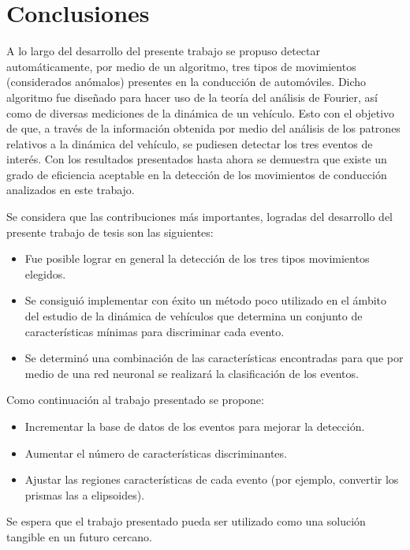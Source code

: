 \chapter{Conclusiones}

A lo largo del desarrollo del presente trabajo se propuso detectar automáticamente, por medio de un algoritmo, tres tipos de movimientos (considerados anómalos) presentes en la conducción de automóviles.
Dicho algoritmo fue diseñado para hacer uso de la teoría del análisis de Fourier, así como de diversas mediciones de la dinámica de un vehículo. 
Esto con el objetivo de que, a través de la información obtenida por medio del análisis de los patrones relativos a la dinámica del vehículo, se pudiesen detectar los tres eventos de interés.
Con los resultados presentados hasta ahora se demuestra que existe un grado de eficiencia aceptable en la detección de los movimientos de conducción analizados en este trabajo.

Se considera que las contribuciones más importantes, logradas del desarrollo del presente trabajo de tesis son las siguientes:

\begin{itemize}

\item Fue posible lograr en general la detección de los tres tipos movimientos elegidos.

\item Se consiguió implementar con éxito un método poco utilizado en el ámbito del estudio de la dinámica de vehículos que determina un conjunto de características mínimas para discriminar cada evento.

\item Se determinó una combinación de las características encontradas para que por medio de una red neuronal se realizará la clasificación de los eventos.

\end{itemize} 

Como continuación al trabajo presentado se propone:
\begin{itemize}
\item Incrementar la base de datos de los eventos para mejorar la detección.
\item Aumentar el número de características discriminantes.
\item Ajustar las regiones características de cada evento (por ejemplo, convertir los prismas las a elipsoides).
\end{itemize}

Se espera que el trabajo presentado pueda ser utilizado como una solución tangible en un futuro cercano.